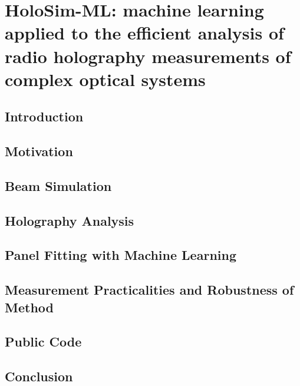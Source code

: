 \chapter{HoloSim-ML: machine learning applied to the efficient analysis of radio holography measurements of complex optical systems}

\section{Introduction}
\section{Motivation}
\section{Beam Simulation}
\section{Holography Analysis}
\section{Panel Fitting with Machine Learning}
\section{Measurement Practicalities and Robustness of Method}
\section{Public Code}
\section{Conclusion}